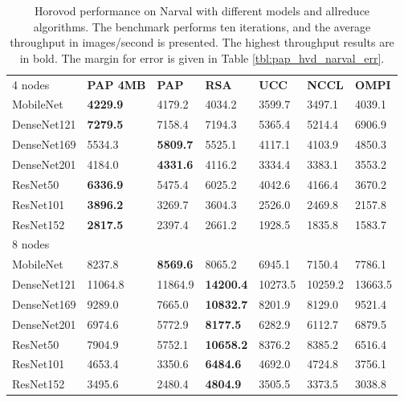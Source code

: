 \begin{table}
    \centering
    \caption[PAP-Aware Horovod Performance on Narval]{
        Horovod performance on Narval with different models and allreduce algorithms.
        The benchmark performs ten iterations, and the average throughput in images/second is presented.
        The highest throughput results are in bold.
        The margin for error is given in Table \ref{tbl:pap_hvd_narval_err}.
    }
    \begin{tabular}{lllllll}
     4 nodes    & \textbf{PAP 4MB} & \textbf{PAP} & \textbf{RSA} & \textbf{UCC} & \textbf{NCCL} & \textbf{OMPI} \\
    MobileNet   & \textbf{4229.9}    & 4179.2       & 4034.2  & 3599.7  & 3497.1  & 4039.1  \\
    DenseNet121 & \textbf{7279.5}    & 7158.4       & 7194.3  & 5365.4  & 5214.4  & 6906.9  \\
    DenseNet169 & 5534.3    & \textbf{5809.7}       & 5525.1  & 4117.1  & 4103.9  & 4850.3  \\
    DenseNet201 & 4184.0      & \textbf{4331.6}       & 4116.2  & 3334.4  & 3383.1  & 3553.2  \\
    ResNet50    & \textbf{6336.9}    & 5475.4       & 6025.2  & 4042.6  & 4166.4  & 3670.2  \\
    ResNet101   & \textbf{3896.2}    & 3269.7       & 3604.3  & 2526.0    & 2469.8  & 2157.8  \\
    ResNet152   & \textbf{2817.5}    & 2397.4       & 2661.2  & 1928.5  & 1835.8  & 1583.7  \\ \hline
    8 nodes     & ~ & ~ & ~     & ~     & ~    & ~    \\ 
    MobileNet   & 8237.8    & \textbf{8569.6}       & 8065.2  & 6945.1  & 7150.4  & 7786.1  \\
    DenseNet121 & 11064.8   & 11864.9      & \textbf{14200.4} & 10273.5 & 10259.2 & 13663.5 \\
    DenseNet169 & 9289.0      & 7665.0         & \textbf{10832.7} & 8201.9  & 8129.0    & 9521.4  \\
    DenseNet201 & 6974.6    & 5772.9       & \textbf{8177.5}  & 6282.9  & 6112.7  & 6879.5  \\
    ResNet50    & 7904.9    & 5752.1       & \textbf{10658.2} & 8376.2  & 8385.2  & 6516.4  \\
    ResNet101   & 4653.4    & 3350.6       & \textbf{6484.6}  & 4692.0    & 4724.8  & 3756.1  \\
    ResNet152   & 3495.6    & 2480.4       & \textbf{4804.9}  & 3505.5  & 3373.5  & 3038.8  \\ \hline

\end{tabular}
\end{table}
